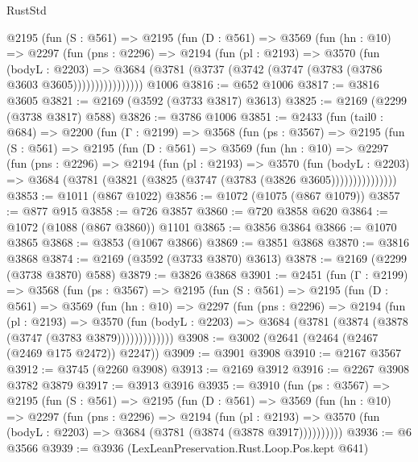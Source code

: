 \begin{lexlean}{RustStd}
\begin{coremodule}
          @2195
            (fun (S : @561) =>
            @2195
              (fun (D : @561) =>
              @3569
                (fun (hn : @10) =>
                @2297
                  (fun (pns : @2296) =>
                  @2194
                    (fun (pl : @2193) =>
                    @3570
                      (fun (bodyL : @2203) =>
                      @3684 (@3781 (@3737 (@3742 (@3747 (@3783 (@3786 @3603 @3605))))))))))))))))
    @1006
@3816 := @652 @1006
@3817 := @3816 @3605
@3821 := @2169 (@3592 (@3733 @3817) @3613)
@3825 := @2169 (@2299 (@3738 @3817) @588)
@3826 := @3786 @1006
@3851 := @2433
    (fun (tail0 : @684) =>
    @2200
      (fun (Γ : @2199) =>
      @3568
        (fun (ps : @3567) =>
        @2195
          (fun (S : @561) =>
          @2195
            (fun (D : @561) =>
            @3569
              (fun (hn : @10) =>
              @2297
                (fun (pns : @2296) =>
                @2194
                  (fun (pl : @2193) =>
                  @3570
                    (fun (bodyL : @2203) =>
                    @3684 (@3781 (@3821 (@3825 (@3747 (@3783 (@3826 @3605)))))))))))))))
@3853 := @1011 (@867 @1022)
@3856 := @1072 (@1075 (@867 @1079))
@3857 := @877 @915
@3858 := @726 @3857
@3860 := @720 @3858 @620
@3864 := @1072 (@1088 (@867 @3860)) @1101
@3865 := @3856 @3864
@3866 := @1070 @3865
@3868 := @3853 (@1067 @3866)
@3869 := @3851 @3868
@3870 := @3816 @3868
@3874 := @2169 (@3592 (@3733 @3870) @3613)
@3878 := @2169 (@2299 (@3738 @3870) @588)
@3879 := @3826 @3868
@3901 := @2451
    (fun (Γ : @2199) =>
    @3568
      (fun (ps : @3567) =>
      @2195
        (fun (S : @561) =>
        @2195
          (fun (D : @561) =>
          @3569
            (fun (hn : @10) =>
            @2297
              (fun (pns : @2296) =>
              @2194
                (fun (pl : @2193) =>
                @3570
                  (fun (bodyL : @2203) =>
                  @3684 (@3781 (@3874 (@3878 (@3747 (@3783 @3879)))))))))))))
@3908 := @3002 (@2641 (@2464 (@2467 (@2469 @175 @2472)) @2247))
@3909 := @3901 @3908
@3910 := @2167 @3567
@3912 := @3745 (@2260 @3908)
@3913 := @2169 @3912
@3916 := @2267 @3908 @3782 @3879
@3917 := @3913 @3916
@3935 := @3910
    (fun (ps : @3567) =>
    @2195
      (fun (S : @561) =>
      @2195
        (fun (D : @561) =>
        @3569
          (fun (hn : @10) =>
          @2297
            (fun (pns : @2296) =>
            @2194
              (fun (pl : @2193) =>
              @3570 (fun (bodyL : @2203) => @3684 (@3781 (@3874 (@3878 @3917))))))))))
@3936 := @6 @3566
@3939 := @3936 (LexLeanPreservation.Rust.Loop.Pos.kept @641)

\end{coremodule}
\end{lexlean}

